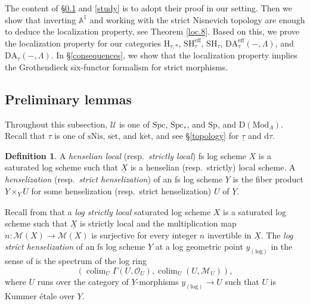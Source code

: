\documentclass[10pt]{amsart}
\theoremstyle{definition}
\newtheorem{df}[thm]{Definition}
\theoremstyle{remark}
\numberwithin{equation}{subsection}
\newcommand{\A}{\mathbb{A}}
\newcommand{\cM}{\mathcal{M}}
\newcommand{\cO}{\mathcal{O}}
\newcommand{\cU}{\mathcal{U}}
\newcommand{\rH}{\mathrm{H}}
\newcommand{\colim}{\mathop{\mathrm{colim}}}
\newcommand{\ul}{\underline}
\newcommand{\eff}{{\mathrm{eff}}}
\newcommand{\Spt}{\mathrm{Sp}}
\newcommand{\SH}{\mathrm{SH}}
\newcommand{\DLambda}{\mathrm{D}(\mathrm{Mod}_{\Lambda})}
\newcommand{\DA}{\mathrm{DA}}
\newcommand{\Spc}{\mathrm{Spc}}
\newcommand{\dtau}{\mathrm{d}\tau}
\newcommand{\sNis}{\mathrm{sNis}}
\newcommand{\ketale}{\mathrm{k\acute{e}t}}
\newcommand{\setale}{\mathrm{s\acute{e}t}}
\begin{document}
The content of \S \ref{preliminary} and \ref{study} is to adopt their proof in our setting.
Then we show that inverting $\A^1$ and working with the strict Nisnevich topology are enough to deduce the localization property, see Theorem \ref{loc.8}.
Based on this, we prove the localization property for our categories $\rH_{\tau,*}$, $\SH_{\tau}^\eff$, $\SH_{\tau}$, $\DA_{\tau}^\eff(-,\Lambda)$, and $\DA_{\tau}(-,\Lambda)$.
In \S \ref{consequences}, we show that the localization property implies the Grothendieck six-functor formalism for strict morphisms.


\subsection{Preliminary lemmas}
\label{preliminary}
Throughout this subsection, $\cU$ is one of $\Spc$, $\Spc_*$, and $\Spt$, and $\DLambda$.
Recall that $\tau$ is one of $\sNis$, $\setale$, and $\ketale$,
and see \S \ref{topology} for $\ul{\tau}$ and $\dtau$.




\begin{df}
A \emph{henselian local} (resp.\ \emph{strictly local}) fs log scheme $X$ is a saturated log scheme such that $\ul{X}$ is a henselian (resp.\ strictly) local scheme.
A \emph{henselization} (resp.\ \emph{strict henselization}) of an fs log scheme $Y$ is the fiber product $Y\times_{\ul{Y}}U$ for some henselization (resp.\ strict henselization) $U$ of $\ul{Y}$.

Recall from \cite[Point 6 in 2.8]{Nak} that a \emph{log strictly local} saturated log scheme $X$ is a saturated log scheme such that $\ul{X}$ is strictly local and the multiplication map $n\colon \cM(X)\to \cM(X)$ is surjective for every integer $n$ invertible in $\ul{X}$. The \emph{log strict henselization} of an fs log scheme $Y$ at a log geometric point $y_{(\mathrm{log})}$ in the sense of \cite[Definition 2.5]{Nak} is the spectrum of the log ring
\[
(\colim_U \Gamma(U,\cO_U),\colim_U(U,\cM_U)),
\]
where $U$ runs over the category of $Y$-morphisms $y_{(\mathrm{log})}\to U$ such that $U$ is Kummer \'etale over $Y$.
\end{df}
\end{document}
